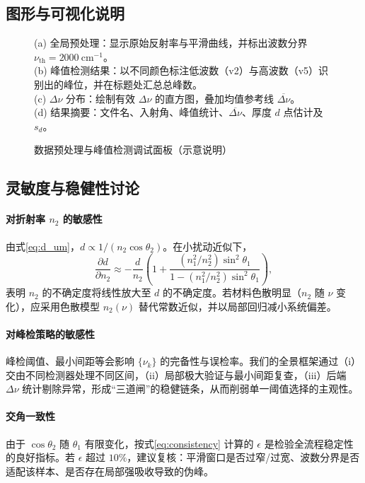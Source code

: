 \documentclass{ctexart} %
\begin{document}
\subsection{图形与可视化说明}
\begin{figure}[h]
    \centering
    \caption{数据预处理与峰值检测调试面板（示意说明）}
    \label{fig:debug_panel}
    \begin{minipage}{0.95\linewidth}
        \small
        (a) 全局预处理：显示原始反射率与平滑曲线，并标出波数分界 \(\nu_{\mathrm{th}}=2000~\mathrm{cm}^{-1}\)。\\
        (b) 峰值检测结果：以不同颜色标注低波数（v2）与高波数（v5）识别出的峰位，并在标题处汇总总峰数。\\
        (c) \(\Delta\nu\) 分布：绘制有效 \(\Delta\nu\) 的直方图，叠加均值参考线 \(\overline{\Delta\nu}\)。\\
        (d) 结果摘要：文件名、入射角、峰值统计、\(\overline{\Delta\nu}\)、厚度 \(d\) 点估计及 \(s_d\)。
    \end{minipage}
\end{figure}

\subsection{灵敏度与稳健性讨论}
\paragraph{对折射率 \(n_2\) 的敏感性} 由式\eqref{eq:d_um}，\(d\propto 1/(n_2\cos\theta_2)\)。在小扰动近似下，
\[
    \frac{\partial d}{\partial n_2} \approx -\frac{d}{n_2}\left(1+\frac{(n_1^2/n_2^2)\sin^2\theta_1}{1-(n_1^2/n_2^2)\sin^2\theta_1}\right),
\]
表明 \(n_2\) 的不确定度将线性放大至 \(d\) 的不确定度。若材料色散明显（\(n_2\) 随 \(\nu\) 变化），应采用色散模型 \(n_2(\nu)\) 替代常数近似，并以局部回归减小系统偏差。

\paragraph{对峰检策略的敏感性} 峰检阈值、最小间距等会影响 \(\{\nu_k\}\) 的完备性与误检率。我们的全景框架通过（i）交由不同检测器处理不同区间，（ii）局部极大验证与最小间距复查，（iii）后端 \(\Delta\nu\) 统计剔除异常，形成“三道闸”的稳健链条，从而削弱单一阈值选择的主观性。

\paragraph{交角一致性} 由于 \(\cos\theta_2\) 随 \(\theta_1\) 有限变化，按式\eqref{eq:consistency} 计算的 \(\epsilon\) 是检验全流程稳定性的良好指标。若 \(\epsilon\) 超过 \(10\%\)，建议复核：平滑窗口是否过窄/过宽、波数分界是否适配该样本、是否存在局部强吸收导致的伪峰。
\end{document}
